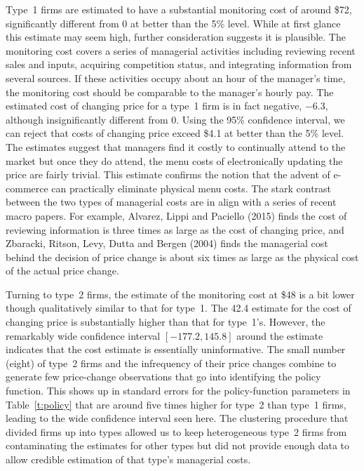 \documentclass[11pt]{article}
\begin{document}
\begin{spacing}{1.3}
Type~1 firms are estimated to have a substantial monitoring cost of
around \$72, significantly different from 0 at better than the 5\%
level. While at first glance this estimate may seem high, further
consideration suggests it is plausible. The monitoring cost covers a
series of managerial activities including reviewing recent sales and
inputs, acquiring competition status, and integrating information from
several sources. If these activities occupy about an hour of the
manager's time, the monitoring cost should be comparable to the
manager's hourly pay. The estimated cost of changing price for a
type~1 firm is in fact negative, $-6.3$, although insignificantly
different from 0. Using the 95\% confidence interval, we can reject
that costs of changing price exceed \$4.1 at better than the 5\%
level. The estimates suggest that managers find it costly to
continually attend to the market but once they do attend, the menu
costs of electronically updating the price are fairly trivial. This
estimate confirms the notion that the advent of e-commerce can
practically eliminate physical menu costs. The stark contrast between
the two types of managerial costs are in align with a series of recent
macro papers. For example, Alvarez, Lippi and Paciello (2015) finds
the cost of reviewing information is three times as large as the cost
of changing price, and Zbaracki, Ritson, Levy, Dutta and Bergen (2004)
finds the managerial cost behind the decision of price change is about
six times as large as the physical cost of the actual price change.

Turning to type~2 firms, the estimate of the monitoring cost at \$48
is a bit lower though qualitatively similar to that for type~1. The
42.4 estimate for the cost of changing price is substantially higher
than that for type~1's. However, the remarkably wide confidence
interval $[-177.2, 145.8]$ around the estimate indicates that the cost
estimate is essentially uninformative. The small number (eight) of
type~2 firms and the infrequency of their price changes combine to
generate few price-change observations that go into identifying the
policy function. This shows up in standard errors for the
policy-function parameters in Table~\ref{t:policy} that are around
five times higher for type~2 than type~1 firms, leading to the wide
confidence interval seen here. The clustering procedure that divided
firms up into types allowed us to keep heterogeneous type~2 firms from
contaminating the estimates for other types but did not provide enough
data to allow credible estimation of that type's managerial costs.


\end{spacing}
\end{document}
